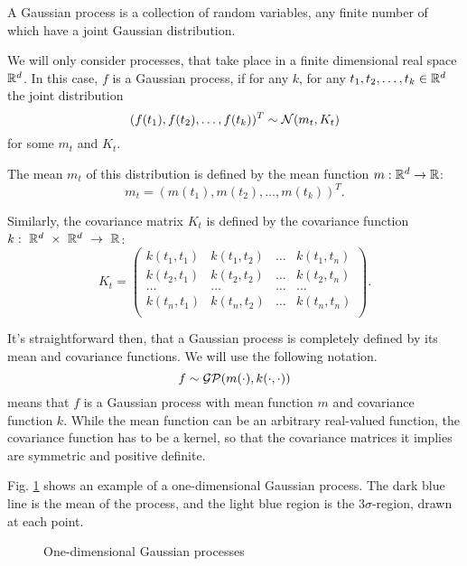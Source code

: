 A Gaussian process is a collection of random variables, any finite number of which have a joint Gaussian distribution.

We will only consider processes, that take place in a finite dimensional real space $\mathbb{R}^d$. In this case, $f$ is a Gaussian process, if for any $k$, for any $t_1, t_2, \ldots, t_k \in \mathbb{R}^d$ the joint distribution
$$(f(t_1), f(t_2), \ldots, f(t_k))^T \sim \mathcal{N}(m_t, K_t)$$
for some $m_t$ and $K_t$.

The mean $m_t$ of this distribution is defined by the mean function $m: \mathbb{R}^d \rightarrow \mathbb{R}$:
$$m_t = (m(t_1), m(t_2), \ldots, m(t_k))^T.$$

Similarly, the covariance matrix $K_t$ is defined by the covariance function $k:~\mathbb{R}^d~\times~\mathbb{R}^d~\rightarrow~\mathbb{R}$:
$$K_t = 
\left (\begin{array}{cccc} 
k(t_1, t_1) & k(t_1, t_2) & \ldots & k(t_1, t_n) \\
k(t_2, t_1) & k(t_2, t_2) & \ldots & k(t_2, t_n) \\
\ldots & \ldots & \ldots & \ldots \\
k(t_n, t_1) & k(t_n, t_2) & \ldots & k(t_n, t_n) \\
\end{array} \right).
$$

It's straightforward then, that a Gaussian process is completely defined by its mean and covariance functions. We will use the following notation. 
$$f \sim \mathcal{GP}(m(\cdot), k(\cdot, \cdot))$$
means that $f$ is a Gaussian process with mean function $m$ and covariance function $k$. While the mean function can be an arbitrary real-valued function, the covariance function has to be a kernel, so that the covariance matrices it implies are symmetric and positive definite.

Fig. \ref{reg_example} shows an example of a one-dimensional Gaussian process. The dark blue line is the mean of the process, and the light blue region is the $3\sigma$-region, drawn at each point.


\begin{figure}[!h]
	\centering
		
	\caption{One-dimensional Gaussian processes}
	\label{reg_example}
\end{figure}